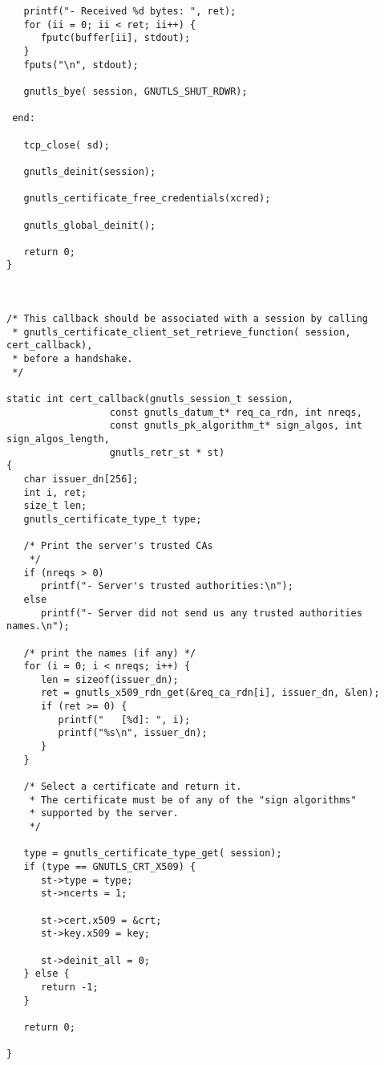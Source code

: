 \begin{verbatim}
   printf("- Received %d bytes: ", ret);
   for (ii = 0; ii < ret; ii++) {
      fputc(buffer[ii], stdout);
   }
   fputs("\n", stdout);

   gnutls_bye( session, GNUTLS_SHUT_RDWR);

 end:

   tcp_close( sd);

   gnutls_deinit(session);

   gnutls_certificate_free_credentials(xcred);

   gnutls_global_deinit();

   return 0;
}



/* This callback should be associated with a session by calling
 * gnutls_certificate_client_set_retrieve_function( session, cert_callback),
 * before a handshake.
 */

static int cert_callback(gnutls_session_t session,
                  const gnutls_datum_t* req_ca_rdn, int nreqs,
                  const gnutls_pk_algorithm_t* sign_algos, int sign_algos_length,
                  gnutls_retr_st * st)
{
   char issuer_dn[256];
   int i, ret;
   size_t len;
   gnutls_certificate_type_t type;

   /* Print the server's trusted CAs
    */
   if (nreqs > 0)
      printf("- Server's trusted authorities:\n");
   else
      printf("- Server did not send us any trusted authorities names.\n");

   /* print the names (if any) */
   for (i = 0; i < nreqs; i++) {
      len = sizeof(issuer_dn);
      ret = gnutls_x509_rdn_get(&req_ca_rdn[i], issuer_dn, &len);
      if (ret >= 0) {
         printf("   [%d]: ", i);
         printf("%s\n", issuer_dn);
      }
   }

   /* Select a certificate and return it.
    * The certificate must be of any of the "sign algorithms"
    * supported by the server.
    */

   type = gnutls_certificate_type_get( session);
   if (type == GNUTLS_CRT_X509) {
      st->type = type;
      st->ncerts = 1;

      st->cert.x509 = &crt;
      st->key.x509 = key;

      st->deinit_all = 0;
   } else {
      return -1;
   }

   return 0;

}

\end{verbatim}
